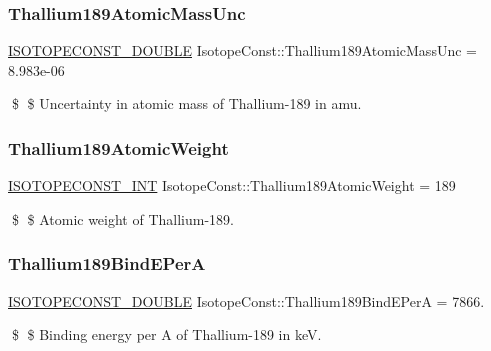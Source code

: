 \subsubsection{\texorpdfstring{Thallium189\+Atomic\+Mass\+Unc}{Thallium189AtomicMassUnc}}
{\footnotesize\ttfamily \mbox{\hyperlink{group___isotope_const-_macros_ga8f45a7272ce02c0b4c65c44636ed719a}{I\+S\+O\+T\+O\+P\+E\+C\+O\+N\+S\+T\+\_\+\+D\+O\+U\+B\+LE}} Isotope\+Const\+::\+Thallium189\+Atomic\+Mass\+Unc = 8.\+983e-\/06}

\$ \$ Uncertainty in atomic mass of Thallium-\/189 in amu. \mbox{\label{group___isotope_const-_thallium-_tl189_gac244129f53e660802eeed8c60e631203}} 
\subsubsection{\texorpdfstring{Thallium189\+Atomic\+Weight}{Thallium189AtomicWeight}}
{\footnotesize\ttfamily \mbox{\hyperlink{group___isotope_const-_macros_ga5f18360b3e99483a35c32d789e62621c}{I\+S\+O\+T\+O\+P\+E\+C\+O\+N\+S\+T\+\_\+\+I\+NT}} Isotope\+Const\+::\+Thallium189\+Atomic\+Weight = 189}

\$ \$ Atomic weight of Thallium-\/189. \mbox{\label{group___isotope_const-_thallium-_tl189_gaa912c8496030c9d92b7fbcc4743f9fd0}} 
\subsubsection{\texorpdfstring{Thallium189\+Bind\+E\+PerA}{Thallium189BindEPerA}}
{\footnotesize\ttfamily \mbox{\hyperlink{group___isotope_const-_macros_ga8f45a7272ce02c0b4c65c44636ed719a}{I\+S\+O\+T\+O\+P\+E\+C\+O\+N\+S\+T\+\_\+\+D\+O\+U\+B\+LE}} Isotope\+Const\+::\+Thallium189\+Bind\+E\+PerA = 7866.}

\$ \$ Binding energy per A of Thallium-\/189 in keV. \mbox{\label{group___isotope_const-_thallium-_tl189_gab29998259585d6ed270bf472d6a22826}} 

